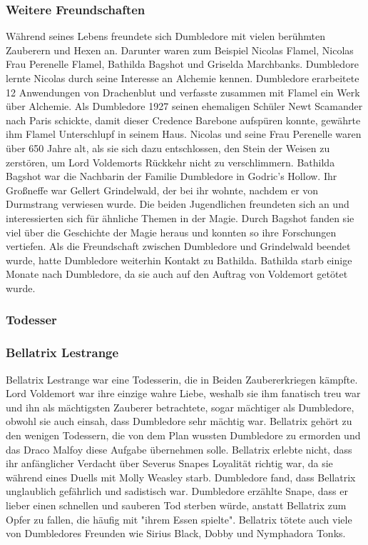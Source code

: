 \documentclass[a4paper, 10pt]{article}
\begin{document}
\subsubsection*{\large Weitere Freundschaften}
Während seines Lebens freundete sich Dumbledore mit vielen berühmten Zauberern und Hexen an. Darunter waren zum Beispiel Nicolas Flamel, Nicolas Frau Perenelle Flamel, Bathilda Bagshot und Griselda Marchbanks.
\vspace{10pt}
\newline
Dumbledore lernte Nicolas durch seine Interesse an Alchemie kennen. Dumbledore erarbeitete 12 Anwendungen von Drachenblut und verfasste zusammen mit Flamel ein Werk über Alchemie. Als Dumbledore 1927 seinen ehemaligen Schüler Newt Scamander nach Paris schickte, damit dieser Credence Barebone aufspüren konnte, gewährte ihm Flamel Unterschlupf in seinem Haus. Nicolas und seine Frau Perenelle waren über 650 Jahre alt, als sie sich dazu entschlossen, den Stein der Weisen zu zerstören, um Lord Voldemorts Rückkehr nicht zu verschlimmern.
\vspace{10pt}
\newline
Bathilda Bagshot war die Nachbarin der Familie Dumbledore in Godric's Hollow. Ihr Großneffe war Gellert Grindelwald, der bei ihr wohnte, nachdem er von Durmstrang verwiesen wurde. Die beiden Jugendlichen freundeten sich an und interessierten sich für ähnliche Themen in der Magie. Durch Bagshot fanden sie viel über die Geschichte der Magie heraus und konnten so ihre Forschungen vertiefen. Als die Freundschaft zwischen Dumbledore und Grindelwald beendet wurde, hatte Dumbledore weiterhin Kontakt zu Bathilda. Bathilda starb einige Monate nach Dumbledore, da sie auch auf den Auftrag von Voldemort getötet wurde.
\subsubsection*{\large Todesser}
\subsubsection*{Bellatrix Lestrange}
Bellatrix Lestrange war eine Todesserin, die in Beiden Zaubererkriegen kämpfte. Lord Voldemort war ihre einzige wahre Liebe, weshalb sie ihm fanatisch treu war und ihn als mächtigsten Zauberer betrachtete, sogar mächtiger als Dumbledore, obwohl sie auch einsah, dass Dumbledore sehr mächtig war. Bellatrix gehört zu den wenigen Todessern, die von dem Plan wussten Dumbledore zu ermorden und das Draco Malfoy diese Aufgabe übernehmen solle. Bellatrix erlebte nicht, dass ihr anfänglicher Verdacht über Severus Snapes Loyalität richtig war, da sie während eines Duells mit Molly Weasley starb. Dumbledore fand, dass Bellatrix unglaublich gefährlich und sadistisch war. Dumbledore erzählte Snape, dass er lieber einen schnellen und sauberen Tod sterben würde, anstatt Bellatrix zum Opfer zu fallen, die häufig mit "ihrem Essen spielte". Bellatrix tötete auch viele von Dumbledores Freunden wie Sirius Black, Dobby und Nymphadora Tonks.
\end{document}
